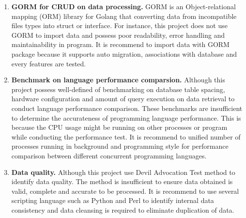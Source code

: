 \begin{enumerate}[topsep=0pt,itemsep=-1ex,partopsep=1ex,parsep=1.5ex]
	\item \textbf{GORM for CRUD on data processing.} GORM is an Object-relational mapping (ORM) library for Golang that converting data from incompatible files types into struct or interface. For instance, this project does not use GORM to import data and possess poor readability, error handling and maintainability in program. It is recommend to import data with GORM package because it supports auto migration, associations with database and every features are tested. 
	\linebreak
	
	\item \textbf{Benchmark on language performance comparsion.} Although this project possess well-defined of benchmarking on database table spacing, hardware configuration and amount of query execution on data retrieval to conduct language performance comparison. These benchmarks are insufficient to determine the accurateness of programming language performance. This is because the CPU usage might be running on other processes or program while conducting the performance test. It is recommend to unified number of processes running in background and programming style for performance comparison between different concurrent programming languages.
	
	\item \textbf{Data quality.} Although this project use Devil Advocation Test method to identify data quality. The method is insufficient to ensure data obtained is valid, complete and accurate to be processed. It is recommend to use several scripting language such as Python and Perl to identify internal data consistency and data cleansing is required to eliminate duplication of data. 
	
\end{enumerate}









